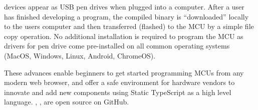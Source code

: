 \MC devices appear as USB pen drives when plugged into a computer. After a user has finished developing a program, the compiled binary is ``downloaded'' locally to the users computer and then transferred (flashed) to the MCU by a simple file copy operation. No additional installation is required to program the MCU as drivers for pen drive come pre-installed on all common operating systems (MacOS, Windows, Linux, Android, ChromeOS).

These advances enable beginners to get started programming MCUs from any modern web browser, and offer a safe environment for hardware vendors to innovate and add new components using Static TypeScript as a high level language. \emph{\href{https://github.com/microsoft/pxt}{\MCN}}, \emph{\href{https://github.com/lancaster-university/codal}{\CON}}, \emph{\href{https://github.com/microsoft/UF2}{\UFN}} are open source on GitHub.